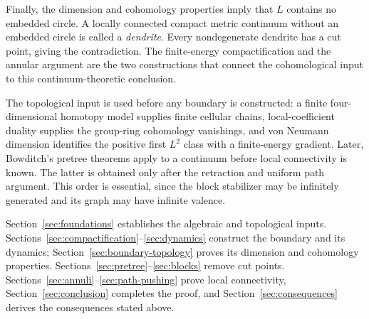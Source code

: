 Finally, the dimension and cohomology properties imply that $L$ contains
no embedded circle. A locally connected compact metric continuum without an embedded
circle is called a \emph{dendrite}. Every nondegenerate dendrite has a
cut point, giving the contradiction.
The finite-energy compactification and the annular argument are the
two constructions that connect the cohomological input to this
continuum-theoretic conclusion.

The topological input is used before any boundary is constructed:
a finite four-dimensional homotopy model supplies finite cellular chains,
local-coefficient duality supplies the group-ring cohomology vanishings,
and von Neumann dimension identifies the positive first $L^2$ class
with a finite-energy
gradient. Later, Bowditch's pretree theorems apply to a continuum before
local connectivity is known. The latter is obtained only after the
retraction and uniform path argument. This order is essential, since
the block stabilizer may be infinitely generated and its graph may
have infinite valence.

Section~\ref{sec:foundations} establishes the algebraic and topological
inputs. Sections~\ref{sec:compactification}--\ref{sec:dynamics} construct
the boundary and its dynamics; Section~\ref{sec:boundary-topology}
proves its dimension and cohomology properties.
Sections~\ref{sec:pretree}--\ref{sec:blocks} remove cut points.
Sections~\ref{sec:annuli}--\ref{sec:path-pushing} prove local connectivity,
Section~\ref{sec:conclusion} completes the proof, and
Section~\ref{sec:consequences} derives the consequences stated above.
